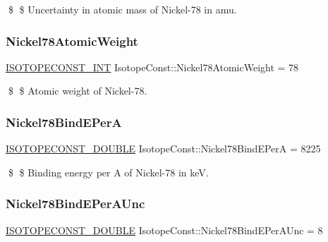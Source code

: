 \$ \$ Uncertainty in atomic mass of Nickel-\/78 in amu. \mbox{\label{group___isotope_const-_nickel-_ni78_gab95e5ca62ac3a59804779cb2b0f2e9b4}} 
\subsubsection{\texorpdfstring{Nickel78\+Atomic\+Weight}{Nickel78AtomicWeight}}
{\footnotesize\ttfamily \mbox{\hyperlink{group___isotope_const-_macros_ga5f18360b3e99483a35c32d789e62621c}{I\+S\+O\+T\+O\+P\+E\+C\+O\+N\+S\+T\+\_\+\+I\+NT}} Isotope\+Const\+::\+Nickel78\+Atomic\+Weight = 78}

\$ \$ Atomic weight of Nickel-\/78. \mbox{\label{group___isotope_const-_nickel-_ni78_ga355d422ca22aff4322ee5164b489ac9e}} 
\subsubsection{\texorpdfstring{Nickel78\+Bind\+E\+PerA}{Nickel78BindEPerA}}
{\footnotesize\ttfamily \mbox{\hyperlink{group___isotope_const-_macros_ga8f45a7272ce02c0b4c65c44636ed719a}{I\+S\+O\+T\+O\+P\+E\+C\+O\+N\+S\+T\+\_\+\+D\+O\+U\+B\+LE}} Isotope\+Const\+::\+Nickel78\+Bind\+E\+PerA = 8225}

\$ \$ Binding energy per A of Nickel-\/78 in keV. \mbox{\label{group___isotope_const-_nickel-_ni78_gabc84fa8cdf6d30e17756256ac9787bc7}} 
\subsubsection{\texorpdfstring{Nickel78\+Bind\+E\+Per\+A\+Unc}{Nickel78BindEPerAUnc}}
{\footnotesize\ttfamily \mbox{\hyperlink{group___isotope_const-_macros_ga8f45a7272ce02c0b4c65c44636ed719a}{I\+S\+O\+T\+O\+P\+E\+C\+O\+N\+S\+T\+\_\+\+D\+O\+U\+B\+LE}} Isotope\+Const\+::\+Nickel78\+Bind\+E\+Per\+A\+Unc = 8}

